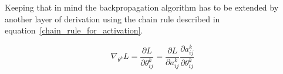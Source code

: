 Keeping that in mind the
backpropagation algorithm has to be extended by another layer of derivation using the
chain rule described in equation~\eqref{chain_rule_for_activation}.

\begin{equation} \label{chain_rule_for_activation}
\nabla_{\theta^k} L = \frac{\partial L}{\partial \theta_{ij}^k} =
\frac{\partial L}{\partial a_{ij}^k} \frac{\partial a_{ij}^k}{\partial \theta_{ij}^k}
\end{equation}


